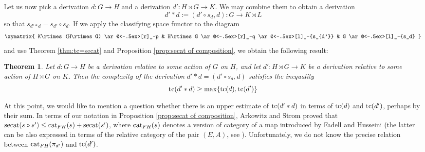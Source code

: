 \documentclass[11pt]{amsart}
\theoremstyle{plain}
\newtheorem{theorem}{Theorem}[section]
\theoremstyle{definition}
\newcommand{\ZZ}{{\mathbb{Z}}}
\newcommand{\cat}{\mathop{\rm cat}\nolimits}
\newcommand{\secat}{\mathop{\rm secat}\nolimits}
\newcommand{\tc}{\mathop{\rm tc}\nolimits}
\newcommand{\Hom}{\mathrm{Hom}}
\begin{document}
Let us now pick a derivation $d\colon G\to H$ and a derivation $d'\colon H\rtimes G\to K$. We may combine 
them to obtain a derivation 
$$d'\ast d:=(d'\circ s_d,d)\colon G\to K\rtimes L$$
so that $s_{d'\ast d}=s_{d'}\circ s_d$. 
If we apply the classifying space functor to the diagram 
$$\xymatrix{
K\rtimes(H\rtimes G) \ar@<-.5ex>[r]_-p  & H\rtimes G \ar@<-.5ex>[r]_-q 
\ar@<-.5ex>[l]_-{s_{d'}} &  G \ar@<-.5ex>[l]_-{s_d}
}$$
and use Theorem \ref{thm:tc=secat} and Proposition \ref{prop:secat of composition}, we obtain
the following result:

\begin{theorem}
Let $d\colon G\to H$ be a derivation relative to some action of $G$ on $H$, and let 
$d'\colon H\rtimes G\to K$ be a derivation relative to some action of 
$H\rtimes G$ on $K$. Then the complexity of the derivation $d'\ast d=(d'\circ s_d,d)$
satisfies the inequality
    $$\tc(d'\ast d)\ge\max\{\tc(d),\tc(d')\}$$
\end{theorem}

At this point, we would like to mention a question whether there is an upper estimate of
$\tc(d'\ast d)$ in terms of $\tc(d)$ and $\tc(d')$, perhaps by their sum. 
In terms of our notation in Proposition \ref{prop:secat of composition}, 
Arkowitz and Strom \cite[Theorem 5.4]{ArkowitzStrom2004} proved that 
$\secat(s\circ s')\le \cat_{FH}(s)+\secat(s')$, where $\cat_{FH}(s)$ denotes a version
of category of a map introduced by Fadell and Husseini (the latter can be also expressed
in terms of the relative category of the pair $(E,A)$, see \cite[Section 7.2]{CLOT}). 
Unfortunately, we do not know the precise relation between $\cat_{FH}(\pi_{d'})$ and
$\tc(d')$. 

\end{document}
